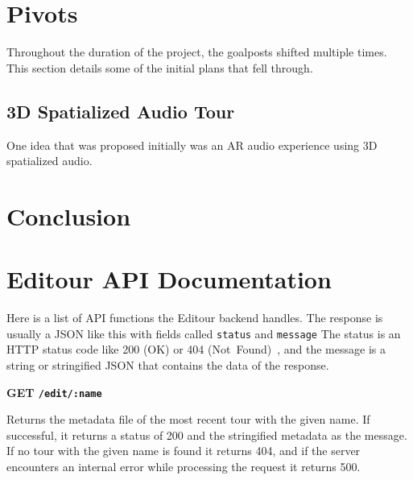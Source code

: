 \documentclass[a4paper, 10pt, american, titlepage]{article}
\newenvironment{indented}[1]%
{\begin{list}{}%
	{\setlength{\leftmargin}{#1}}%
	\item[]%
}
{\end{list}}
\begin{document}
\clearpage

\section{Pivots}
\label{sec:pivots}

Throughout the duration of the project, the goalposts shifted multiple times.
This section details some of the initial plans that fell through.

\subsection{3D Spatialized Audio Tour}
\label{sec:3dSpatializedAudioTour}

One idea that was proposed initially was an AR audio experience using 3D
spatialized audio.

\clearpage

\section{Conclusion}
\label{sec:conclusion}

\clearpage %

\begin{singlespace}
	\printbibliography
\end{singlespace}

\clearpage

\appendices
\section{Editour API Documentation}
\label{sec:editourAPIDocumentation}

Here is a list of API functions the Editour backend handles. The response is
usually a JSON like this with fields called \texttt{status} and \texttt{message}
The status is an HTTP status code like 200 (OK) or 404
(Not~Found)~\autocite{rfc7231}, and the message is a string or stringified JSON
that contains the data of the response.

\noindent\textbf{GET \texttt{/edit/:name}}

\begin{indented}{1cm}
	Returns the metadata file of the most recent tour with the given name. If
	successful, it returns a status of 200 and the stringified metadata as the
	message. If no tour with the given name is found it returns 404, and if the
	server encounters an internal error while processing the request it returns
	500.
\end{indented}
\end{document}
